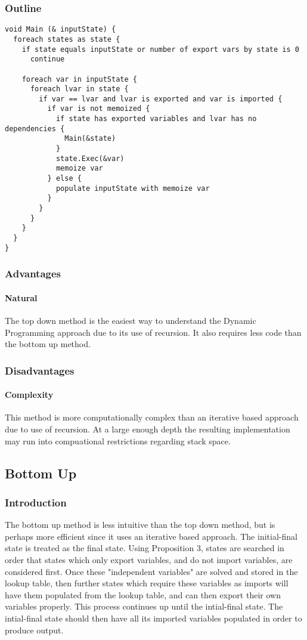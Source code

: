\documentclass[11pt,twocolumn]{article}
\begin{document}
\subsubsection{Outline}
\begin{small}
\begin{verbatim}
void Main (& inputState) {
  foreach states as state {
    if state equals inputState or number of export vars by state is 0
      continue

    foreach var in inputState {
      foreach lvar in state {
        if var == lvar and lvar is exported and var is imported {
          if var is not memoized {
            if state has exported variables and lvar has no dependencies {
              Main(&state)
            }
            state.Exec(&var)
            memoize var
          } else {
            populate inputState with memoize var
          }
        }
      }
    }
  }
}
\end{verbatim}
\end{small}

\subsubsection{Advantages}
\paragraph{Natural}
The top down method is the easiest way to understand the Dynamic Programming approach due to its use of recursion. It also requires less code than the bottom up method.
\subsubsection{Disadvantages}
\paragraph{Complexity}
This method is more computationally complex than an iterative based approach due to use of recursion. At a large enough depth the resulting implementation may run into compuational restrictions regarding stack space.

\subsection{Bottom Up}
\subsubsection{Introduction}
The bottom up method is less intuitive than the top down method, but is perhaps more efficient since it uses an iterative based approach. The initial-final state is treated as the final state. Using Proposition 3, states are searched in order that states which only export variables, and do not import variables, are considered first. Once these "independent variables" are solved and stored in the lookup table, then further states which require these variables as imports will have them populated from the lookup table, and can then export their own variables properly. This process continues up until the intial-final state. The intial-final state should then have all its imported variables populated in order to produce output.
\end{document}

